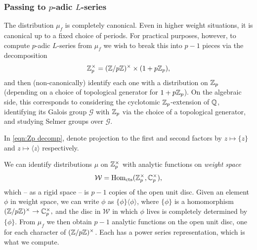 \documentclass[a4paper,11pt]{article}
\newcommand{\W}{\mathcal{W}}
\numberwithin{equation}{section}
\begin{document}
\subsubsection{Passing to $p$-adic $L$-series}
The distribution $\mu_f$ is completely canonical. Even in higher weight situations, it is canonical up to a fixed choice of periods. For practical purposes, however, to compute $p$-adic $L$-series from $\mu_f$ we wish to break this into $p-1$ pieces via the decomposition
\begin{equation}\label{eqn:Zp decomp}
	\mathbb{Z}_p^\times = (\mathbb{Z}/p\mathbb{Z})^\times \times (1+p\mathbb{Z}_p),
\end{equation}
 and then (non-canonically) identify each one with a distribution on $\mathbb{Z}_p$ (depending on a choice of topological generator for $1+p\mathbb{Z}_p$). On the algebraic side, this corresponds to considering the cyclotomic $\mathbb{Z}_p$-extension of $\mathbb{Q}$, identifying its Galois group $\mathcal{G}$ with $\mathbb{Z}_p$ via the choice of a topological generator, and studying Selmer groups over $\mathcal{G}$.


\begin{notation}
	In \eqref{eqn:Zp decomp}, denote projection to the first and second factors by $z \mapsto \{z\}$ and $z \mapsto \langle z\rangle$ respectively.
\end{notation}

We can identify distributions $\mu$ on $\mathbb{Z}_p^\times$ with analytic functions on \emph{weight space}
\[
	\W = \mathrm{Hom}_{\mathrm{cts}}(\Zp^\times, \C_p^\times),
\]
 which -- as a rigid space -- is $p-1$ copies of the open unit disc. Given an element $\phi$ in weight space, we can write $\phi$ as $\{\phi\}\langle\phi\rangle$, where $\{\phi\}$ is a homomorphism $(\mathbb{Z}/p\mathbb{Z})^\times \rightarrow \mathbb{C}_p^\times,$ and the disc in $\W$ in which $\phi$ lives is completely determined by $\{\phi\}$. From $\mu_f$ we then obtain $p-1$ analytic functions on the open unit disc, one for each character of $(\mathbb{Z}/p\mathbb{Z})^\times$. Each has a power series representation, which is what we compute.
\end{document}
